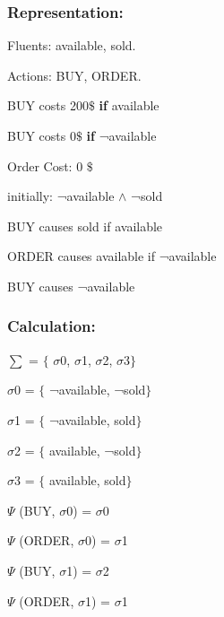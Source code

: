 \documentclass[11pt]{article}
\begin{document}
	\subsubsection{Representation:}\label{par:p202}
	\indent 
	\par Fluents: available, sold.\par
	Actions: BUY, ORDER.\par
	BUY costs 200$\$$  \textbf{if} available\par
	
	BUY costs 0$\$$  \textbf{if} ¬available\par
	
	
	Order Cost: 0 $\$$
	
	initially: ¬available $\wedge$  ¬sold\par
	
	BUY causes sold if available\par
	
	ORDER causes available if ¬available\par
	
	BUY causes ¬available\\
	
	\subsubsection{Calculation:}\label{par:p302}
	\indent \par
	$ \sum $ = $ \{ $ $ \sigma $0, $ \sigma $1, $ \sigma $2, $ \sigma $3$ \} $ \par
	
	$ \sigma $0 = $ \{ $ ¬available, ¬sold$ \} $ \par
	
	$ \sigma $1 = $ \{ $ ¬available, sold$ \} $ \par
	
	$ \sigma $2 = $ \{ $ available, ¬sold$ \} $ \par
	
	$ \sigma $3 = $ \{ $ available, sold$ \} $ \par
	\(  \Psi  \)  (BUY, $ \sigma $0) = $ \sigma $0\par
	
	\(  \Psi  \)  (ORDER, $ \sigma $0) = $ \sigma $1\par
	
	\(  \Psi  \)  (BUY, $ \sigma $1) = $ \sigma $2\par
	
	\(  \Psi  \)  (ORDER, $ \sigma $1) = $ \sigma $1\par
	
\end{document}
